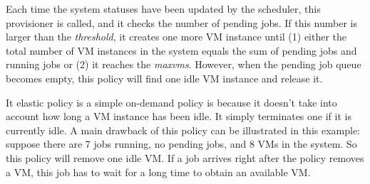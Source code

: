 Each time the system statuses have been updated by the scheduler, this
provisioner is called, and it checks the number of pending jobs. If
this number is larger than the \emph{threshold}, it creates one more
VM instance until (1) either the total number of VM instances in the
system equals the sum of pending jobs and running jobs or (2) it reaches
the \emph{maxvms}. However, when the pending job queue becomes empty,
this policy will find one idle VM instance and release it.

It elastic policy is a simple on-demand policy is because it doesn't
take into account how long a VM instance has been idle. It simply
terminates one if it is currently idle. A main drawback of this policy
can be illustrated in this example: suppose there are 7 jobs running,
no pending jobs, and 8 VMs in the system. So this policy will remove
one idle VM. If a job arrives right after the policy removes a VM,
this job has to wait for a long time to obtain an available VM.

